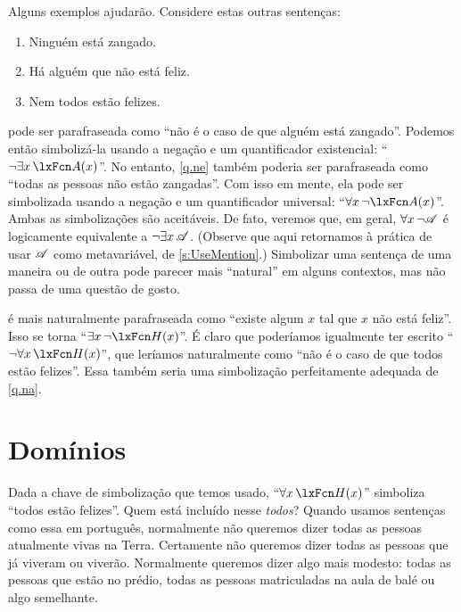 
Alguns exemplos ajudarão. Considere estas outras sentenças:
	\begin{enumerate}
		\item\label{q.ne} Ninguém está zangado.
		\item\label{q.en} Há alguém que não está feliz.
		\item\label{q.na} Nem todos estão felizes.
	\end{enumerate}
 pode ser parafraseada como \textquotedblleft não é o caso de que alguém está zangado\textquotedblright{}. Podemos então simbolizá-la usando a negação e um quantificador existencial: \textquotedblleft $\enot \exists x\,\atom{A}{x}$\textquotedblright{}. No entanto, \cref*{q.ne} também poderia ser parafraseada como \textquotedblleft todas as pessoas não estão zangadas\textquotedblright{}. Com isso em mente, ela pode ser simbolizada usando a negação e um quantificador universal: \textquotedblleft $\forall x\, \enot \atom{A}{x}$\textquotedblright{}. Ambas as simbolizações são aceitáveis. De fato, veremos que, em geral, $\forall x\, \neg\mathscr{A}$ é logicamente equivalente a $\neg\exists x\,\mathscr{A}$. (Observe que aqui retornamos à prática de usar $\mathscr{A}$ como metavariável, de \cref{s:UseMention}.) Simbolizar uma sentença de uma maneira ou de outra pode parecer mais \textquotedblleft natural\textquotedblright{} em alguns contextos, mas não passa de uma questão de gosto.

 é mais naturalmente parafraseada como \textquotedblleft existe algum $x$ tal que $x$ não está feliz\textquotedblright{}. Isso se torna \textquotedblleft $\exists x\, \enot \atom{H}{x}$\textquotedblright{}. É claro que poderíamos igualmente ter escrito \textquotedblleft $\enot\forall x\,\atom{H}{x}$\textquotedblright{}, que leríamos naturalmente como \textquotedblleft não é o caso de que todos estão felizes\textquotedblright{}. Essa também seria uma simbolização perfeitamente adequada de \cref*{q.na}.


\section{Domínios}
Dada a chave de simbolização que temos usado, \textquotedblleft $\forall x\,\atom{H}{x}$\textquotedblright{} simboliza \textquotedblleft todos estão felizes\textquotedblright{}. Quem está incluído nesse \emph{todos}? Quando usamos sentenças como essa em português, normalmente não queremos dizer todas as pessoas atualmente vivas na Terra. Certamente não queremos dizer todas as pessoas que já viveram ou viverão. Normalmente queremos dizer algo mais modesto: todas as pessoas que estão no prédio, todas as pessoas matriculadas na aula de balé ou algo semelhante.

